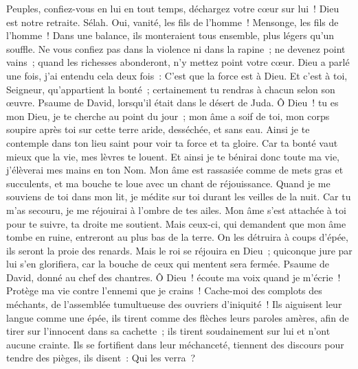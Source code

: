 \begin{multicols}{2}
Peuples, confiez-vous en lui en tout temps, déchargez votre cœur sur lui~! Dieu est notre retraite. Sélah.
Oui, vanité, les fils de l'homme~! Mensonge, les fils de l'homme~! Dans une balance, ils monteraient tous ensemble, plus légers qu'un souffle.
Ne vous confiez pas dans la violence ni dans la rapine~; ne devenez point vains~; quand les richesses abonderont, n'y mettez point votre cœur.
Dieu a parlé une fois, j'ai entendu cela deux fois~: C'est que la force est à Dieu.
Et c'est à toi, Seigneur, qu'appartient la bonté~; certainement tu rendras à chacun selon son œuvre.
\VerseOne{}Psaume de David, lorsqu'il était dans le désert de Juda.
Ô Dieu~! tu es mon Dieu, je te cherche au point du jour~; mon âme a soif de toi, mon corps soupire après toi sur cette terre aride, desséchée, et sans eau.
Ainsi je te contemple dans ton lieu saint pour voir ta force et ta gloire.
Car ta bonté vaut mieux que la vie, mes lèvres te louent.
Et ainsi je te bénirai donc toute ma vie, j'élèverai mes mains en ton Nom.
Mon âme est rassasiée comme de mets gras et succulents, et ma bouche te loue avec un chant de réjouissance.
Quand je me souviens de toi dans mon lit, je médite sur toi durant les veilles de la nuit.
Car tu m'as secouru, je me réjouirai à l'ombre de tes ailes.
Mon âme s'est attachée à toi pour te suivre, ta droite me soutient.
Mais ceux-ci, qui demandent que mon âme tombe en ruine, entreront au plus bas de la terre.
On les détruira à coups d'épée, ils seront la proie des renards.
Mais le roi se réjouira en Dieu~; quiconque jure par lui s'en glorifiera, car la bouche de ceux qui mentent sera fermée.
\VerseOne{}Psaume de David, donné au chef des chantres.
Ô Dieu~! écoute ma voix quand je m'écrie~! Protège ma vie contre l'ennemi que je crains~!
Cache-moi des complots des méchants, de l'assemblée tumultueuse des ouvriers d'iniquité~!
Ils aiguisent leur langue comme une épée, ils tirent comme des flèches leurs paroles amères,
afin de tirer sur l'innocent dans sa cachette~; ils tirent soudainement sur lui et n'ont aucune crainte.
Ils se fortifient dans leur méchanceté, tiennent des discours pour tendre des pièges, ils disent~: Qui les verra~?

\end{multicols}
